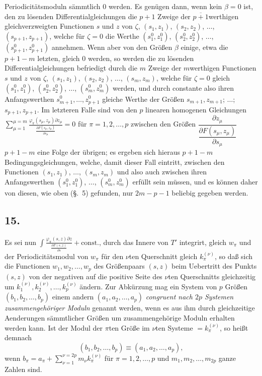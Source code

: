 \documentclass{article}
\begin{document}
Periodicitätsmoduln sämmtlich 0 werden. Es genügen dann, wenn kein $\beta = 0$ ist, den zu lösenden Differentialgleichungen die $p+1$ Zweige der $\overline{p+1}$werthigen gleichverzweigten Functionen $s$ und $z$ von $\zeta$, $(s_{1}, z_{1})$, $(s_{2}, z_{2})$, $\ldots$, $(s_{p+1}, z_{p+1})$, welche für $\zeta = 0$ die Werthe $(s_{1}^{0}, z_{1}^{0})$, $(s_{2}^{0}, z_{2}^{0})$, $\ldots$, $(s_{p+1}^{0}, z_{p+1}^{0})$ annehmen. Wenn aber von den Größen $\beta$ einige, etwa die $p+1-m$ letzten, gleich 0 werden, so werden die zu lösenden Differentialgleichungen befriedigt durch die $m$ Zweige der $m$werthigen Functionen $s$ und $z$ von $\zeta$, $(s_{1}, z_{1})$, $(s_{2}, z_{2})$, $\ldots$, $(s_{m}, z_{m})$, welche für $\zeta = 0$ gleich $(s_{1}^{0}, z_{1}^{0})$, $(s_{2}^{0}, z_{2}^{0})$, $\ldots$, $(s_{m}^{0}, z_{m}^{0})$ werden, und durch constante also ihren Anfangswerthen $s_{m+1}^{0}, \ldots, z_{p+1}^{0}$ gleiche Werthe der Größen $s_{m+1}, z_{m+1}$; $\ldots$; $s_{p+1}, z_{p+1}$. Im letzteren Falle sind von den $p$ linearen homogenen Gleichungen $\displaystyle\sum_{\mu=1}^{\mu=m} \frac{\varphi_{\pi}(s_{\mu}, z_{\mu}) \partial z_{\mu}}{\frac{\partial F(s_{\mu}, z_{\mu})}{\partial s_{\mu}}} = 0$ für $\pi = 1, 2, \ldots, p$ zwischen den Größen $\dfrac{\partial z_{\mu}}{\dfrac{\partial F(s_{\mu}, z_{\mu})}{\partial s_{\mu}}}$ $p+1-m$ eine Folge der übrigen; es ergeben sich hieraus $p+1-m$ Bedingungsgleichungen, welche, damit dieser Fall eintritt, zwischen den Functionen $(s_{1}, z_{1})$, $\ldots$, $(s_{m}, z_{m})$ und also auch zwischen ihren Anfangswerthen $(s_{1}^{0}, z_{1}^{0})$, $\ldots$, $(s_{m}^{0}, z_{m}^{0})$ erfüllt sein müssen, und es können daher von diesen, wie oben (§.~5) gefunden, nur $2m-p-1$ beliebig gegeben werden.

\subsection*{15.}

Es sei nun $\displaystyle\int \frac{\varphi_{\pi}(s, z) \partial z}{\frac{\partial F(s, z)}{\partial s}} + \text{const.}$, durch das Innere von $T'$ integrirt, gleich $w_{\pi}$ und der Periodicitätsmodul von $w_{\pi}$ für den $\nu$ten Querschnitt gleich $k_{\pi}^{(\nu)}$, so daß sich die Functionen $w_{1}, w_{2}, \ldots, w_{p}$ des Größenpaars $(s, z)$ beim Uebertritt des Punkts $(s, z)$ von der negativen auf die positive Seite des $\nu$ten Querschnitts gleichzeitig um $k_{1}^{(\nu)}, k_{2}^{(\nu)}, \ldots, k_{p}^{(\nu)}$ ändern. Zur Abkürzung mag ein System von $p$ Größen $(b_{1}, b_{2}, \ldots, b_{p})$ einem andern $(a_{1}, a_{2}, \ldots, a_{p})$ \emph{congruent nach $2p$ Systemen zusammengehöriger Moduln} genannt werden, wenn es aus ihm durch gleichzeitige Aenderungen sämmtlicher Größen um zusammengehörige Moduln erhalten werden kann. Ist der Modul der $\pi$ten Größe im $\nu$ten Systeme $= k_{\pi}^{(\nu)}$, so heißt demnach
\[ (b_{1}, b_{2}, \ldots, b_{p}) \equiv (a_{1}, a_{2}, \ldots, a_{p}), \]
wenn $b_{\pi} = a_{\pi} + \displaystyle\sum_{\nu=1}^{\nu=2p} m_{\nu} k_{\pi}^{(\nu)}$ für $\pi = 1, 2, \ldots, p$ und $m_{1}, m_{2}, \ldots, m_{2p}$ ganze Zahlen sind.
\end{document}

